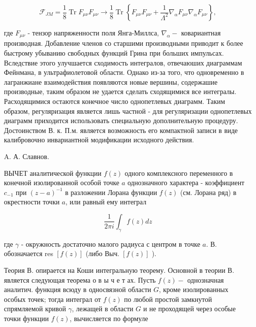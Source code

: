 \documentclass[10pt]{article}
\begin{document}
\[

\mathscr{F}_{J M}=\frac{1}{8} \operatorname{Tr} F_{\mu \nu} F_{\mu \nu} \rightarrow \frac{1}{8} \operatorname{Tr}\left\{F_{\mu \nu} F_{\mu \nu}+\frac{1}{\Lambda^{2}} \nabla_{\alpha} F_{\mu \nu} \nabla_{\alpha} F_{\mu \nu}\right\},

\]



где $F_{\mu \nu}$ - тензор напряженности поля Янга-Миллса, $\nabla_{\alpha}-$ ковариантная производная. Добавление членов со старшими производными приводит к более быстрому убыванию свободных функций Грина при больших импульсах. Вследствие этого улучшается сходимость интегралов, отвечаюших диаграммам Фейнмана, в ультрафиолетовой области. Однако из-за того, что одновременно в лагранжиане взаимодействия появляются новые вершины, содержашие производные, таким образом не удается сделать сходящимися все интегралы. Расходящимися остаются конечное число однопетлевых диаграмм. Таким образом, регуляризация является лишь частной - для регуляризации однопетлевых диаграмм приходится использовать специальную дополнительную процедуру. Достоинством В. к. П.м. является возможность его компактной записи в виде калибровочно инвариантной модификации исходного действия.



A. А. Славнов.



ВЫЧЕТ аналитической функции $f(z)$ одного комплексного переменного в конечной изолированной особой точке $a$ однозначного характера - коэффициент $c_{-1}$ при $(z-a)^{-1}$ в разложении Лорана функции $f(z)$ (см. Лорана ряд) в окрестности точки $a$, или равный ему интеграл



\[

\frac{1}{2 \pi i} \int_{\gamma} f(z) d z

\]



где $\gamma$ - окружность достаточно малого радиуса с центром в точке $a$. В. обозначается res $[f(z)]$ (либо Выч. $[f(z)]$ ).



Теория В. опирается на Коши интегральную теорему. Основной в теории В. является следующая теорема о в ы ч е т ах. Пусть $f(z)-$ однозначная аналитич. функция всюду в односвязной области $G$, кроме изолированных особых точек; тогда интеграл от $f(z)$ по любой простой замкнутой спрямляемой кривой $\gamma$, лежащей в области $G$ и не проходящей через особые точки функции $f(z)$, вычисляется по формуле
\end{document}
